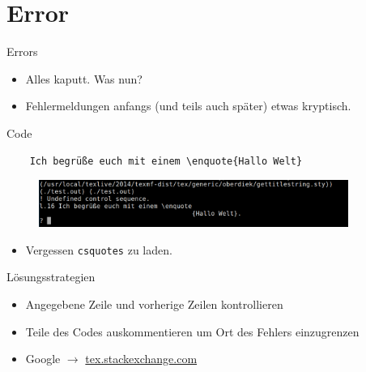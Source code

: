 \section{Error}
\begin{frame}[fragile]{Errors}
  \begin{itemize}
    \item Alles kaputt. Was nun?
    \item Fehlermeldungen anfangs (und teils auch später) etwas kryptisch.
  \end{itemize}
  \begin{block}{Code}
    \begin{lstlisting}
    Ich begrüße euch mit einem \enquote{Hallo Welt}
    \end{lstlisting}
  \end{block}
  \begin{figure}
  \centering
  \includegraphics[width=0.9\textwidth]{figures/error1.png}
  \end{figure}
  \huge
  \begin{itemize}
    \item<2->[$\Rightarrow$] Vergessen \texttt{csquotes} zu laden.
  \end{itemize}
\end{frame}

\begin{frame}{Lösungsstrategien}
  \Large
  \begin{itemize}
    \item Angegebene Zeile und vorherige Zeilen kontrollieren
    \item Teile des Codes auskommentieren um Ort des Fehlers einzugrenzen
    \item Google $\rightarrow$ \href{http://tex.stackexchange.com}{tex.stackexchange.com}
  \end{itemize}
\end{frame}
